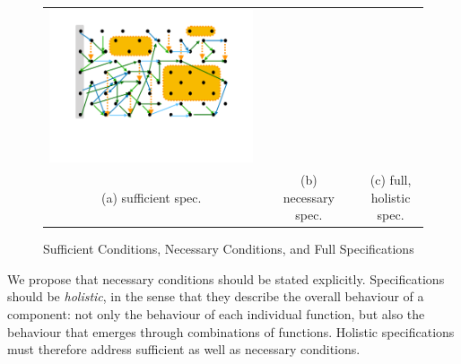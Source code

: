 \begin{figure}[htb]
\begin{tabular}{clclc}
\begin{minipage}{0.29\textwidth}
 \includegraphics[width=\linewidth, trim=100  120 130 60,clip]{diagrams/neccSuffYellowAllExtended.pdf}
 \end{minipage}
\\
(a) sufficient  spec.& & (b) necessary spec. & & (c) full, holistic spec.
 \end{tabular}
  \vspace*{-2.5mm}
  \caption{Sufficient Conditions, Necessary Conditions, and Full Specifications}
 \label{fig:NecessaryAndSuff}
 \end{figure}
 
 We propose that  necessary conditions should be stated
 explicitly. Specifications should be \emph{holistic}, in the sense
 that they describe the  overall behaviour of a component: not only the
 behaviour of each individual function, but also  the
 behaviour that emerges through combinations of functions.
%
Holistic specifications must therefore address sufficient as well as necessary conditions.

